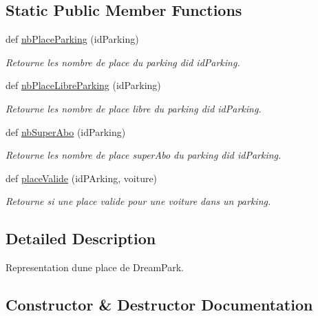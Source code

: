 \subsection*{Static Public Member Functions}
\begin{DoxyCompactItemize}
\item 
def \hyperlink{classm_1_1_parking_1_1_place_a533b5faf1f2481ffed9af9986ddf4544}{nb\+Place\+Parking} (id\+Parking)
\begin{DoxyCompactList}\small\item\em Retourne les nombre de place du parking d\textquotesingle{}id id\+Parking. \end{DoxyCompactList}\item 
def \hyperlink{classm_1_1_parking_1_1_place_aa1794c6bffad71616cfe268d486f6ad7}{nb\+Place\+Libre\+Parking} (id\+Parking)
\begin{DoxyCompactList}\small\item\em Retourne les nombre de place libre du parking d\textquotesingle{}id id\+Parking. \end{DoxyCompactList}\item 
def \hyperlink{classm_1_1_parking_1_1_place_a9194c1b69f465d71987ec38e903ddf2c}{nb\+Super\+Abo} (id\+Parking)
\begin{DoxyCompactList}\small\item\em Retourne les nombre de place super\+Abo du parking d\textquotesingle{}id id\+Parking. \end{DoxyCompactList}\item 
def \hyperlink{classm_1_1_parking_1_1_place_a417f2340552c8a492ec6fa31f880f90e}{place\+Valide} (id\+P\+Arking, voiture)
\begin{DoxyCompactList}\small\item\em Retourne si une place valide pour une voiture dans un parking. \end{DoxyCompactList}\end{DoxyCompactItemize}


\subsection{Detailed Description}
Representation d\textquotesingle{}une place de Dream\+Park. 

\subsection{Constructor \& Destructor Documentation}
\hypertarget{classm_1_1_parking_1_1_place_ab779933067355ffdc888f138b7f55316}{}
